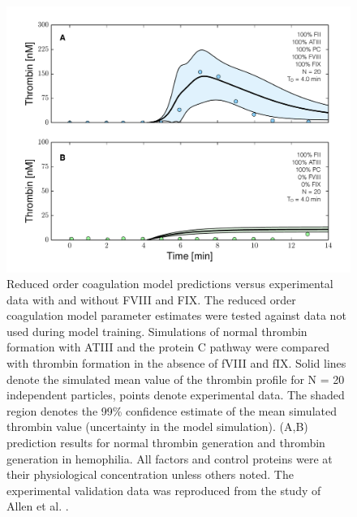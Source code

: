 \documentclass[12pt]{article}
\begin{document}
\begin{figure}
\centering
\includegraphics[width=1.0\textwidth]{./figs/Figure-6-Hemophilia.pdf}
\caption{Reduced order coagulation model predictions versus experimental data with and without FVIII and FIX.
The reduced order coagulation model parameter estimates were tested against data not used during model training. 
Simulations of normal thrombin formation with ATIII and the protein C pathway were compared with thrombin formation in the absence of fVIII and fIX.
Solid lines denote the simulated mean value of the thrombin profile for N = 20 independent particles, points denote experimental data.
The shaded region denotes the 99\% confidence estimate of the mean simulated thrombin value (uncertainty in the model simulation). 
(A,B) prediction results for normal thrombin generation and thrombin generation in hemophilia. 
All factors and control proteins were at their physiological concentration unless others noted.
The experimental validation data was reproduced from the study of Allen et al. \citep{ALLEN2006}.}\label{fig-hemophilia}
\end{figure}

\clearpage
\end{document}

